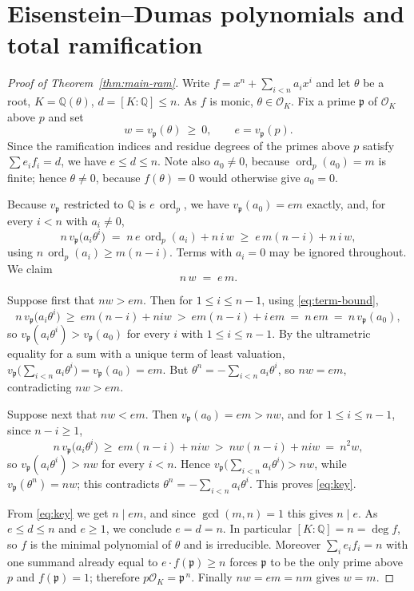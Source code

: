 \documentclass[11pt,reqno]{amsart}
\theoremstyle{plain}
\theoremstyle{definition}
\theoremstyle{remark}
\newcommand{\Q}{\mathbb{Q}}
\newcommand{\OK}{\mathcal{O}_K}
\newcommand{\vp}{v_{\mathfrak{p}}}
\newcommand{\ord}{\operatorname{ord}}
\newcommand{\p}{\mathfrak{p}}
\begin{document}
\section{Eisenstein--Dumas polynomials and total ramification}\label{sec:dumas}

\begin{proof}[Proof of Theorem~\ref{thm:main-ram}]
Write $f=x^n+\sum_{i<n}a_ix^i$ and let $\theta$ be a root, $K=\Q(\theta)$, $d=[K:\Q]\le n$. As $f$
is monic, $\theta\in\OK$. Fix a prime $\p$ of $\OK$ above $p$ and set
\[
  w=\vp(\theta)\ \ge\ 0, \qquad e=\vp(p) .
\]
Since the ramification indices and residue degrees of the primes above $p$ satisfy
$\sum e_i f_i = d$, we have $e\le d\le n$. Note also $a_0\ne0$, because $\ord_p(a_0)=m$ is finite;
hence $\theta\ne0$, because $f(\theta)=0$ would otherwise give $a_0=0$.

Because $\vp$ restricted to $\Q$ is $e\,\ord_p$, we have $\vp(a_0)=em$ exactly, and, for every
$i<n$ with $a_i\ne0$,
\begin{equation}\label{eq:term-bound}
  n\,\vp\bigl(a_i\theta^i\bigr)\;=\;n\,e\,\ord_p(a_i)+n\,i\,w\;\ge\;e\,m(n-i)+n\,i\,w ,
\end{equation}
using $n\,\ord_p(a_i)\ge m(n-i)$. Terms with $a_i=0$ may be ignored throughout. We claim
\begin{equation}\label{eq:key}
  n\,w\;=\;e\,m .
\end{equation}

Suppose first that $nw>em$. Then for $1\le i\le n-1$, using \eqref{eq:term-bound},
\[
  n\,\vp\bigl(a_i\theta^i\bigr)\ \ge\ em(n-i)+niw\ >\ em(n-i)+i\,em\ =\ n\,em\ =\ n\,\vp(a_0),
\]
so $\vp(a_i\theta^i)>\vp(a_0)$ for every $i$ with $1\le i\le n-1$. By the ultrametric equality for
a sum with a unique term of least valuation,
$\vp\bigl(\sum_{i<n}a_i\theta^i\bigr)=\vp(a_0)=em$. But
$\theta^n=-\sum_{i<n}a_i\theta^i$, so $nw=em$, contradicting $nw>em$.

Suppose next that $nw<em$. Then $\vp(a_0)=em>nw$, and for $1\le i\le n-1$, since $n-i\ge1$,
\[
  n\,\vp\bigl(a_i\theta^i\bigr)\ \ge\ em(n-i)+niw\ >\ nw(n-i)+niw\ =\ n^2w ,
\]
so $\vp(a_i\theta^i)>nw$ for every $i<n$. Hence
$\vp\bigl(\sum_{i<n}a_i\theta^i\bigr)>nw$, while
$\vp(\theta^n)=nw$; this contradicts $\theta^n=-\sum_{i<n}a_i\theta^i$. This proves \eqref{eq:key}.

From \eqref{eq:key} we get $n\mid em$, and since $\gcd(m,n)=1$ this gives $n\mid e$. As
$e\le d\le n$ and $e\ge1$, we conclude $e=d=n$. In particular $[K:\Q]=n=\deg f$, so $f$ is the
minimal polynomial of $\theta$ and is irreducible. Moreover $\sum_i e_if_i=n$ with one summand
already equal to $e\cdot f(\p)\ge n$ forces $\p$ to be the only prime above $p$ and $f(\p)=1$;
therefore $p\OK=\p^{\,n}$. Finally $nw=em=nm$ gives $w=m$.
\end{proof}
\end{document}

